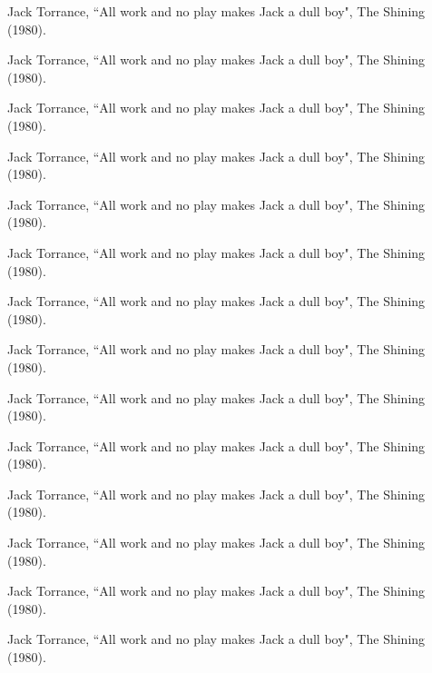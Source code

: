 	\item \hspace{15mm}Jack Torrance, ``All work and no play makes Jack a dull boy", The Shining (1980).
	\item \hspace{20mm}Jack Torrance, ``All work and no play makes Jack a dull boy", The Shining (1980).
	\item \hspace{25mm}Jack Torrance, ``All work and no play makes Jack a dull boy", The Shining (1980).
	\item \hspace{30mm}Jack Torrance, ``All work and no play makes Jack a dull boy", The Shining (1980).
	\item \hspace{25mm}Jack Torrance, ``All work and no play makes Jack a dull boy", The Shining (1980).
	\item \hspace{20mm}Jack Torrance, ``All work and no play makes Jack a dull boy", The Shining (1980).
	\item \hspace{15mm}Jack Torrance, ``All work and no play makes Jack a dull boy", The Shining (1980).
	\item \hspace{10mm}Jack Torrance, ``All work and no play makes Jack a dull boy", The Shining (1980).
	\item \hspace{5mm}Jack Torrance, ``All work and no play makes Jack a dull boy", The Shining (1980).
	\item Jack Torrance, ``All work and no play makes Jack a dull boy", The Shining (1980).
	\item \hspace{5mm}Jack Torrance, ``All work and no play makes Jack a dull boy", The Shining (1980).
	\item \hspace{10mm}Jack Torrance, ``All work and no play makes Jack a dull boy", The Shining (1980).
	\item \hspace{15mm}Jack Torrance, ``All work and no play makes Jack a dull boy", The Shining (1980).
	\item \hspace{20mm}Jack Torrance, ``All work and no play makes Jack a dull boy", The Shining (1980).
